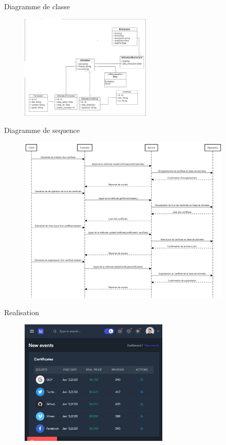 \begin{frame}{Diagramme de classe}

    \begin{figure}[H]
        \centering
        \includegraphics[height=5cm]{assets/images/sprint2-class.png}
    \end{figure}
\end{frame}


\begin{frame}{Diagramme de sequence}
    \begin{figure}[H]
        \centering
        \includegraphics[height=8cm]{assets/images/seq-certifs.png}
    \end{figure}
\end{frame}

\begin{frame}{Realisation}
    \begin{figure}[H]
        \centering
        \includegraphics[height=6cm]{assets/images/certifs-list.png}
    \end{figure}
\end{frame}

